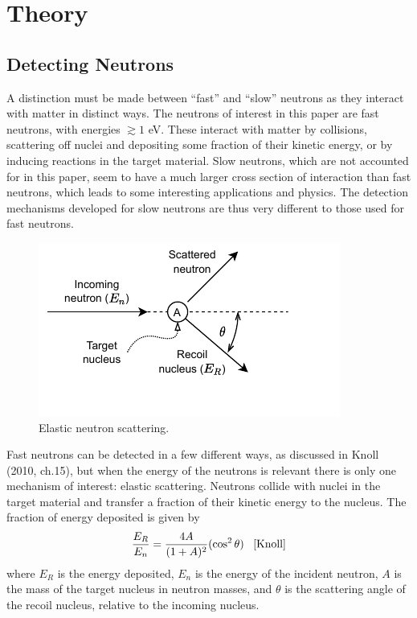 \documentclass[11pt]{article}
\numberwithin{equation}{section}
\numberwithin{figure}{section}
\numberwithin{table}{section}
\begin{document}
\section{Theory}\label{sec:Theory}
\subsection{Detecting Neutrons}
\par A distinction must be made between ``fast'' and ``slow'' neutrons as they interact with matter in distinct ways. The neutrons of interest in this paper are fast neutrons, with energies $\gtrsim1$ eV. These interact with matter by collisions, scattering off nuclei and depositing some fraction of their kinetic energy, or by inducing reactions in the target material. Slow neutrons, which are not accounted for in this paper, seem to have a much larger cross section of interaction than fast neutrons, which leads to some interesting applications and physics. The detection mechanisms developed for slow neutrons are thus very different to those used for fast neutrons. \cite{Knoll}
\begin{figure}
    \includegraphics{Plots/neutronScattering.pdf}
    \caption{Elastic neutron scattering.}
    \label{fig:neutron scattering diagram}
\end{figure}
\par Fast neutrons can be detected in a few different ways, as discussed in Knoll (2010, ch.15), but when the energy of the neutrons is relevant there is only one mechanism of interest: elastic scattering. Neutrons collide with nuclei in the target material and transfer a fraction of their kinetic energy to the nucleus. The fraction of energy deposited is given by
\begin{equation}
    \frac{E_R}{E_n}=\frac{4A}{(1+A)^2}(\cos^2\theta)\;\;\;\cite{Knoll}
    \label{eqn:Neutron scattering fraction}
\end{equation}
where $E_R$ is the energy deposited, $E_n$ is the energy of the incident neutron, $A$ is the mass of the target nucleus in neutron masses, and $\theta$ is the scattering angle of the recoil nucleus, relative to the incoming nucleus.
\end{document}
